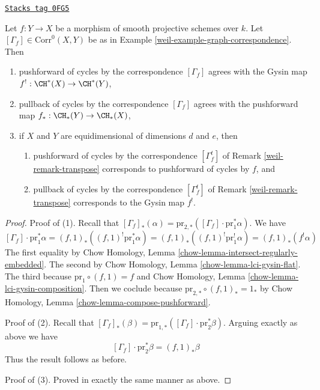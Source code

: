\begin{lemma}
\label{weil-lemma-functor-and-cycles}
\href{https://stacks.math.columbia.edu/tag/0FG5}{\texttt{Stacks tag 0FG5}}

Let $f : Y \to X$ be a morphism of smooth projective schemes over $k$.
Let $[\Gamma_f] \in \text{Corr}^0(X, Y)$ be as in
Example \ref{weil-example-graph-correspondence}. Then
\begin{enumerate}
\item pushforward of cycles by the correspondence $[\Gamma_f]$
agrees with the Gysin map $f^! : \CH^*(X) \to \CH^*(Y)$,
\item pullback of cycles by the correspondence $[\Gamma_f]$
agrees with the pushforward map $f_* : \CH_*(Y) \to \CH_*(X)$,
\item if $X$ and $Y$ are equidimensional of dimensions $d$ and $e$,
then
\begin{enumerate}
\item pushforward of cycles by the correspondence
$[\Gamma_f^t]$ of Remark \ref{weil-remark-transpose}
corresponds to pushforward of cycles by $f$, and
\item pullback of cycles by the correspondence
$[\Gamma_f^t]$ of Remark \ref{weil-remark-transpose}
corresponds to the Gysin map $f^!$.
\end{enumerate}
\end{enumerate}
\end{lemma}

\begin{proof}
Proof of (1). Recall that
$[\Gamma_f]_*(\alpha) =
\text{pr}_{2, *}([\Gamma_f] \cdot \text{pr}_1^*\alpha)$.
We have
$$
[\Gamma_f] \cdot \text{pr}_1^*\alpha =
(f, 1)_*((f, 1)^! \text{pr}_1^*\alpha) =
(f, 1)_*((f, 1)^! \text{pr}_1^!\alpha) =
(f, 1)_*(f^!\alpha)
$$
The first equality by Chow Homology, Lemma
\ref{chow-lemma-intersect-regularly-embedded}.
The second by
Chow Homology, Lemma \ref{chow-lemma-lci-gysin-flat}.
The third because $\text{pr}_1 \circ (f, 1) = f$ and
Chow Homology, Lemma \ref{chow-lemma-lci-gysin-composition}.
Then we coclude because
$\text{pr}_{2, *} \circ (f, 1)_* = 1_*$ by
Chow Homology, Lemma \ref{chow-lemma-compose-pushforward}.

\medskip\noindent
Proof of (2). Recall that $[\Gamma_f]_*(\beta) =
\text{pr}_{1, *}([\Gamma_f] \cdot \text{pr}_2^*\beta)$.
Arguing exactly as above we have
$$
[\Gamma_f] \cdot \text{pr}_2^*\beta = (f, 1)_*\beta
$$
Thus the result follows as before.

\medskip\noindent
Proof of (3). Proved in exactly the same manner as above.
\end{proof}

